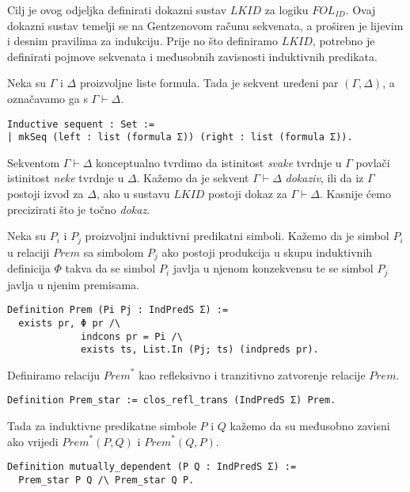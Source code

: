 Cilj je ovog odjeljka definirati dokazni sustav \(\mathit{LKID}\) za logiku \(\mathit{FOL_{ID}}\).
Ovaj dokazni sustav temelji se na Gentzenovom računu sekvenata, a proširen je lijevim i desnim pravilima za indukciju.
Prije no što definiramo \(\mathit{LKID}\), potrebno je definirati pojmove sekvenata i međusobnih zavisnosti induktivnih predikata.

\begin{definition}[Sekvent]
  Neka su \(\Gamma\) i \(\Delta\) proizvoljne liste formula. Tada je sekvent uređeni par \((\Gamma,\Delta)\), a označavamo ga s \(\Gamma \vdash \Delta\).
\begin{verbatim}
Inductive sequent : Set :=
| mkSeq (left : list (formula Σ)) (right : list (formula Σ)).
\end{verbatim}
\end{definition}
\noindent Sekventom \(\Gamma \vdash \Delta\) konceptualno tvrdimo da istinitost \textit{svake}
tvrdnje u \(\Gamma\) povlači istinitost \textit{neke} tvrdnje u \(\Delta\).
Kažemo da je sekvent \(\Gamma \vdash \Delta\) \textit{dokaziv}, ili da iz \(\Gamma\) postoji izvod za \(\Delta\), ako u sustavu \(\mathit{LKID}\) postoji dokaz za \(\Gamma \vdash \Delta\). Kasnije ćemo precizirati što je točno \textit{dokaz}.

\begin{definition}
  Neka su \(P_{i}\) i \(P_{j}\) proizvoljni induktivni predikatni simboli.
  Kažemo da je simbol \(P_{i}\) u relaciji \(\mathit{Prem}\) sa simbolom \(P_{j}\)
  ako postoji produkcija u skupu induktivnih definicija \(\Phi\) takva da
  se simbol \(P_{i}\) javlja u njenom konzekvensu te
  se simbol \(P_{j}\) javlja u njenim premisama.
\begin{verbatim}
Definition Prem (Pi Pj : IndPredS Σ) :=
  exists pr, Φ pr /\
             indcons pr = Pi /\
             exists ts, List.In (Pj; ts) (indpreds pr).
\end{verbatim}
\end{definition}

\begin{definition}
  Definiramo relaciju \(\mathit{Prem}^{\ast}\) kao refleksivno i tranzitivno zatvorenje relacije \(\mathit{Prem}\).
\begin{verbatim}
Definition Prem_star := clos_refl_trans (IndPredS Σ) Prem.
\end{verbatim}
  \noindent Tada za induktivne predikatne simbole \(P\) i \(Q\) kažemo da su
  međusobno zavisni ako vrijedi \(\mathit{Prem}^{\ast}(P, Q)\) i \(\mathit{Prem}^{\ast}(Q, P)\).
\begin{verbatim}
Definition mutually_dependent (P Q : IndPredS Σ) :=
  Prem_star P Q /\ Prem_star Q P.
\end{verbatim}
\end{definition}

